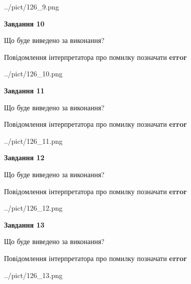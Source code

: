 \documentclass[11pt, ukrainian]{article}
\begin{document}
{\begin {large}
\begin{center}
	{../pict/126_9.png}
\end{center}
\newpage

{\begin {center}\textbf{Завдання 10}\end {center}}\par
Що буде виведено за виконання? \par
Повідомлення інтерпретатора про помилку позначати \textbf{error}

\begin{center}
	{../pict/126_10.png}
\end{center}
\newpage

{\begin {center}\textbf{Завдання 11}\end {center}}\par
Що буде виведено за виконання? \par
Повідомлення інтерпретатора про помилку позначати \textbf{error}

\begin{center}
	{../pict/126_11.png}
\end{center}
\newpage

{\begin {center}\textbf{Завдання 12}\end {center}}\par
Що буде виведено за виконання? \par
Повідомлення інтерпретатора про помилку позначати \textbf{error}

\begin{center}
	{../pict/126_12.png}
\end{center}
\newpage

{\begin {center}\textbf{Завдання 13}\end {center}}\par
Що буде виведено за виконання? \par
Повідомлення інтерпретатора про помилку позначати \textbf{error}

\begin{center}
	{../pict/126_13.png}
\end{center}
\newpage


\end{large}}
\end{document}
